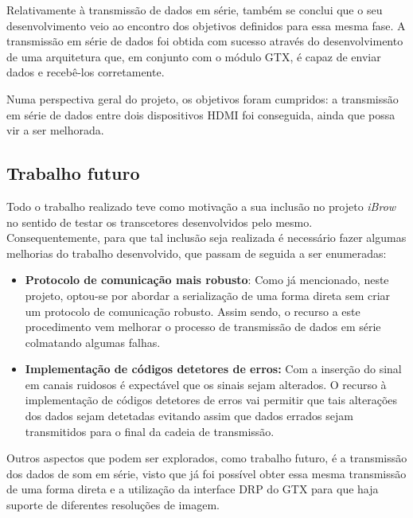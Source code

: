 \documentclass[a4paper]{IEEEtran}
\begin{document}
Relativamente à transmissão de dados em série, também se conclui que o seu desenvolvimento veio ao encontro dos objetivos definidos para essa mesma fase. A transmissão em série de dados foi obtida com sucesso através do desenvolvimento de uma arquitetura que, em conjunto com o módulo GTX, é capaz de enviar dados e recebê-los corretamente.

Numa perspectiva geral do projeto, os objetivos foram cumpridos: a transmissão em série de dados entre dois dispositivos HDMI foi conseguida, ainda que possa vir a ser melhorada. 

\subsection{Trabalho futuro}

Todo o trabalho realizado teve como motivação a sua inclusão no projeto \textit{iBrow} no sentido de testar os transcetores desenvolvidos pelo mesmo. Consequentemente, para que tal inclusão seja realizada é necessário fazer algumas melhorias do trabalho desenvolvido, que passam de seguida a ser enumeradas:
\begin{itemize}
	\item \textbf{Protocolo de comunicação mais robusto}: Como já mencionado, neste projeto, optou-se por abordar a serialização de uma forma direta sem criar um protocolo de comunicação robusto. Assim sendo, o recurso a este procedimento vem melhorar o processo de transmissão de dados em série colmatando algumas falhas.
	
	\item \textbf{Implementação de códigos detetores de erros:} Com a inserção do sinal em canais ruidosos é expectável que os sinais sejam alterados. O recurso à implementação de códigos detetores de erros vai permitir que tais alterações dos dados sejam detetadas evitando assim que dados errados sejam transmitidos para o final da cadeia de transmissão.
\end{itemize}

Outros aspectos que podem ser explorados, como trabalho futuro, é a transmissão dos dados de som em série, visto que já foi possível obter essa mesma transmissão de uma forma direta e a utilização da interface DRP do GTX para que haja suporte de diferentes resoluções de imagem.

%
%
\end{document}
